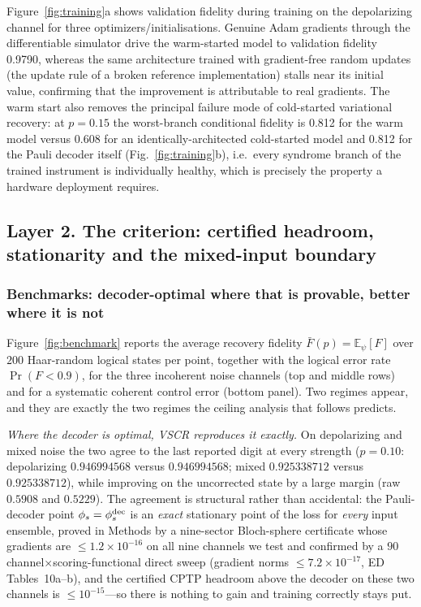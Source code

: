 \documentclass[aps,prxquantum,reprint,superscriptaddress]{revtex4-2}
\begin{document}
Figure~\ref{fig:training}a shows validation fidelity during training on the
depolarizing channel for three optimizers/initialisations. Genuine Adam
gradients through the differentiable simulator drive the warm-started model
to validation fidelity 0.9790, whereas the same architecture trained with
gradient-free random updates (the update rule of a broken reference
implementation) stalls near its initial value, confirming that the
improvement is attributable to real gradients. The warm start also removes
the principal failure mode of cold-started variational recovery: at
$p=0.15$ the worst-branch conditional fidelity is 0.812 for the warm
model versus 0.608 for an identically-architected cold-started model
and 0.812 for the Pauli decoder itself
(Fig.~\ref{fig:training}b), i.e.\ every syndrome branch of the trained
instrument is individually healthy, which is precisely the property a
hardware deployment requires.

\subsection*{Layer 2. The criterion: certified headroom, stationarity and the
mixed-input boundary}

\subsubsection*{Benchmarks: decoder-optimal where that is provable, better where it is not}

Figure~\ref{fig:benchmark} reports the average recovery fidelity
$\bar F(p)=\mathbb{E}_\psi[F]$ over $200$ Haar-random logical states per
point, together with the logical error rate $\Pr(F<0.9)$, for the three
incoherent noise channels (top and middle rows) and for a systematic coherent
control error (bottom panel). Two regimes appear, and they are exactly the two
regimes the ceiling analysis that follows predicts.

\emph{Where the decoder is optimal, VSCR reproduces it exactly.} On depolarizing
and mixed noise the two agree to the last reported digit at every strength
($p=0.10$: depolarizing $0.946994568$ versus $0.946994568$; mixed $0.925338712$
versus $0.925338712$), while improving on the uncorrected state by a large margin
(raw $0.5908$ and $0.5229$). The agreement is structural rather than accidental:
the Pauli-decoder point $\phi_s=\phi^{\rm dec}_s$ is an \emph{exact} stationary
point of the loss for \emph{every} input ensemble, proved in Methods by a
nine-sector Bloch-sphere certificate whose gradients are $\le1.2\times10^{-16}$
on all nine channels we test and confirmed by a $90$
channel$\times$scoring-functional direct sweep (gradient norms
$\le7.2\times10^{-17}$, ED Tables~10a--b), and the
certified CPTP headroom above the decoder on these two channels is
$\le10^{-15}$---so there is nothing to gain and training correctly stays put.
\end{document}
